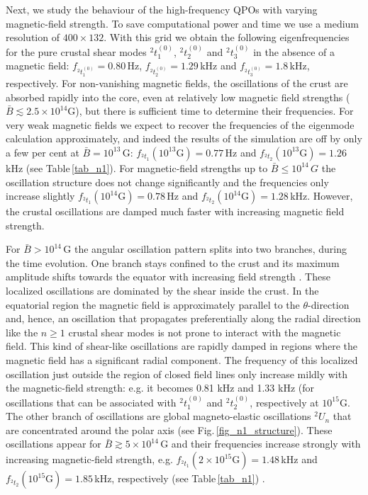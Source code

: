 \documentclass[useAMS,usenatbib]{mnras}
\begin{document}
Next, we study the behaviour of the high-frequency QPOs with varying 
magnetic-field strength. To save computational power and time we use a medium
resolution of $400\times132$. With this grid we obtain the following eigenfrequencies 
for the pure crustal shear modes $^2t^{(0)}_{1}$, $^2t^{(0)}_{2}$ and $^2t^{(0)}_{3}$ in the absence of a magnetic field: $f_{^2t^{(0)}_1}=0.80\,$Hz, 
$f_{^2t^{(0)}_2}=1.29\,$kHz and $f_{^2t^{(0)}_3}=1.8\,$kHz, respectively. For 
non-vanishing magnetic fields, the oscillations of the crust are absorbed 
rapidly into the core, 
even at relatively low magnetic field strengths ($\bar B 
\lesssim2.5\times10^{14}$G), but there is sufficient time to determine their 
frequencies. For very weak magnetic fields we expect to recover the 
frequencies of the 
eigenmode calculation approximately, and indeed the results of the simulation are off by only a few per cent at $\bar 
B=10^{13}\,$G: $f_{^2t_1}^\mathrm{}(10^{13}\text{G})=0.77\,$Hz and 
$f_{^2t_2}^\mathrm{}(10^{13}\text{G})=1.26\,$kHz (see Table\,\ref{tab_n1}).
For magnetic-field strengths up to $\bar B\leq10^{14}\,G$ the oscillation 
structure does not change significantly and the frequencies only increase 
slightly $f_{^2t_1}^\mathrm{}(10^{14}\text{G})=0.78\,$Hz and 
$f_{^2t_2}^\mathrm{}(10^{14}\text{G})=1.28\,$kHz. However, the crustal oscillations are damped much faster with increasing magnetic field strength. 

For $\bar B> 10^{14}\,$G the angular oscillation pattern splits into two 
branches, during the time evolution.
One branch  stays confined to the crust and its maximum 
amplitude shifts towards the equator with increasing field strength \citep[see 
also Figure 4 in][for a similar oscillation pattern obtained in the case of a 
normal fluid core]{Gabler2013b}. These localized oscillations are 
dominated by the shear 
inside the crust. In the equatorial region the magnetic field is 
approximately parallel to the $\theta$-direction and, hence, an oscillation 
that propagates preferentially along the radial direction like the $n\geqslant1$ 
crustal shear modes is not prone to interact with the magnetic 
field. This kind of shear-like oscillations are rapidly damped in regions where the 
magnetic field has a significant radial component. The frequency of this 
localized oscillation just outside  the region of closed field lines only 
increase mildly with the magnetic-field strength: e.g. it becomes 0.81 
kHz and 1.33 kHz (for oscillations that can be associated with 
$^2t^{(0)}_{1}$ and $^2t^{(0)}_{2}$,  respectively at $10^{15}$G.
The other branch of oscillations are global magneto-elastic 
oscillations $^2U_n$ that are concentrated around the polar axis (see
Fig.\,\ref{fig_n1_structure}). 
These oscillations appear for $\bar 
B\gtrsim5\times10^{14}\,$G and their frequencies increase strongly with 
increasing magnetic-field strength, e.g. 
$f_{^2t_1}^\mathrm{}(2\times10^{15}\text{G})=1.48\,$kHz and 
$f_{^2t_2}^\mathrm{}(10^{15}\text{G})=1.85\,$kHz, respectively (see Table\,\ref{tab_n1})
.  
\end{document}
